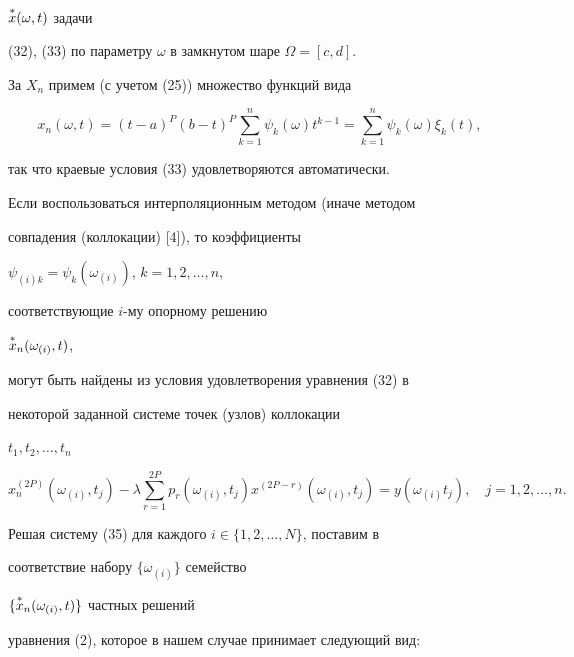 $\overset{*}{x}{}(\omega,t)$ задачи


(32), (33) по параметру $\omega$ в замкнутом шаре $\Omega=[c,d]$.





За $X_n$ примем (с учетом (25)) множество функций вида


\begin{equation}


x_n(\omega,t)=(t-a)^P(b-t)^P\sum^n_{k=1}


\psi_k(\omega)t^{k-1}=\sum^n_{k=1}\psi_k(\omega)


\xi_k(t),


\end{equation}


так что краевые условия (33) удовлетворяются автоматически.





Если воспользоваться интерполяционным методом (иначе методом


совпадения (коллокации) [4]), то коэффициенты


$\psi_{(i)k}=\psi_k(\omega_{(i)})$, $k=1,2,\dotsc,n$,


соответствующие $i$-му опорному решению


$\overset{*}{x}{}_n(\omega_{(i)},t)$,


могут быть найдены из условия удовлетворения уравнения (32) в


некоторой заданной системе точек (узлов) коллокации


$t_1,t_2,\dotsc,t_n$


\begin{equation}


x^{(2P)}_n(\omega_{(i)},t_j)-\lambda\sum^{2P}_{r=1}


p_r(\omega_{(i)},t_j)x^{(2P-r)}(\omega_{(i)},t_j)=


y(\omega_{(i)}t_j),\quad j=1,2,\dotsc,n.


\end{equation}





Решая систему (35) для каждого $i\in\{1,2,\dotsc,N\}$, поставим в


соответствие набору $\{\omega_{(i)}\}$ семейство


$\{\overset{*}{x}{}_n(\omega_{(i)},t)\}$ частных решений


уравнения (2), которое в нашем случае принимает следующий вид:


